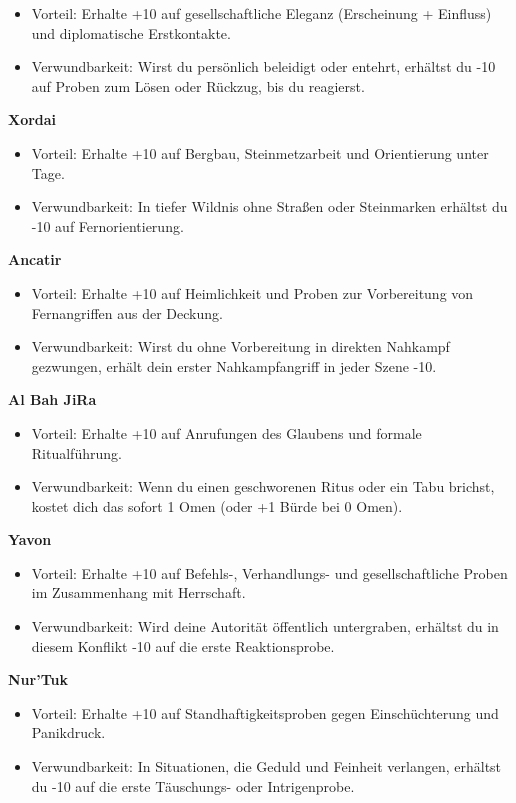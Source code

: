 \begin{itemize}[leftmargin=*,nosep]
\item Vorteil: Erhalte +10 auf gesellschaftliche Eleganz (Erscheinung + Einfluss) und diplomatische Erstkontakte.
\item Verwundbarkeit: Wirst du persönlich beleidigt oder entehrt, erhältst du -10 auf Proben zum Lösen oder Rückzug, bis du reagierst.
\end{itemize}
\noindent\textbf{Xordai}\par
\begin{itemize}[leftmargin=*,nosep]
\item Vorteil: Erhalte +10 auf Bergbau, Steinmetzarbeit und Orientierung unter Tage.
\item Verwundbarkeit: In tiefer Wildnis ohne Straßen oder Steinmarken erhältst du -10 auf Fernorientierung.
\end{itemize}
\noindent\textbf{Ancatir}\par
\begin{itemize}[leftmargin=*,nosep]
\item Vorteil: Erhalte +10 auf Heimlichkeit und Proben zur Vorbereitung von Fernangriffen aus der Deckung.
\item Verwundbarkeit: Wirst du ohne Vorbereitung in direkten Nahkampf gezwungen, erhält dein erster Nahkampfangriff in jeder Szene -10.
\end{itemize}
\noindent\textbf{Al Bah JiRa}\par
\begin{itemize}[leftmargin=*,nosep]
\item Vorteil: Erhalte +10 auf Anrufungen des Glaubens und formale Ritualführung.
\item Verwundbarkeit: Wenn du einen geschworenen Ritus oder ein Tabu brichst, kostet dich das sofort 1 Omen (oder +1 Bürde bei 0 Omen).
\end{itemize}
\noindent\textbf{Yavon}\par
\begin{itemize}[leftmargin=*,nosep]
\item Vorteil: Erhalte +10 auf Befehls-, Verhandlungs- und gesellschaftliche Proben im Zusammenhang mit Herrschaft.
\item Verwundbarkeit: Wird deine Autorität öffentlich untergraben, erhältst du in diesem Konflikt -10 auf die erste Reaktionsprobe.
\end{itemize}
\noindent\textbf{Nur'Tuk}\par
\begin{itemize}[leftmargin=*,nosep]
\item Vorteil: Erhalte +10 auf Standhaftigkeitsproben gegen Einschüchterung und Panikdruck.
\item Verwundbarkeit: In Situationen, die Geduld und Feinheit verlangen, erhältst du -10 auf die erste Täuschungs- oder Intrigenprobe.
\end{itemize}
